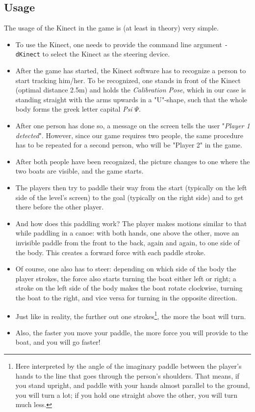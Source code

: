 \subsection{Usage}
The usage of the Kinect in the game is (at least in theory) very simple.
\begin{itemize}
\item To use the Kinect, one needs to provide the command line argument \texttt{-dKinect} to select the Kinect as the steering device.
\item After the game has started, the Kinect software has to recognize a person to start tracking him/her. To be recognized, one stands in front of the Kinect (optimal distance 2.5m) and holds the \emph{Calibration Pose}, which in our case is standing straight with the arms upwards in a "U"-shape, such that the whole body forms the greek letter capital \emph{Psi} $\Psi$.
\item After one person has done so, a message on the screen tells the user "\emph{Player 1 detected}". However, since our game requires two people, the same procedure has to be repeated for a second person, who will be "Player 2" in the game.
\item After both people have been recognized, the picture changes to one where the two boats are visible, and the game starts.
\item The players then try to paddle their way from the start (typically on the left side of the level's screen) to the goal (typically on the right side) and to get there before the other player.
\item And how does this paddling work? The player makes motions similar to that while paddling in a canoe: with both hands, one above the other, move an invisible paddle from the front to the back, again and again, to one side of the body. This creates a forward force with each paddle stroke. 
\item Of course, one also has to steer: depending on which side of the body the player strokes, the force also starts turning the boat either left or right; a stroke on the left side of the body makes the boat rotate clockwise, turning the boat to the right, and vice versa for turning in the opposite direction.
\item Just like in reality, the further out one strokes\footnote{Here interpreted by the angle of the imaginary paddle between the player's hands to the line that goes through the person's shoulders. That means, if you stand upright, and paddle with your hands almost parallel to the ground, you will turn a lot; if you hold one straight above the other, you will turn much less.}, the more the boat will turn.
\item Also, the faster you move your paddle, the more force you will provide to the boat, and you will go faster!
\end{itemize}

